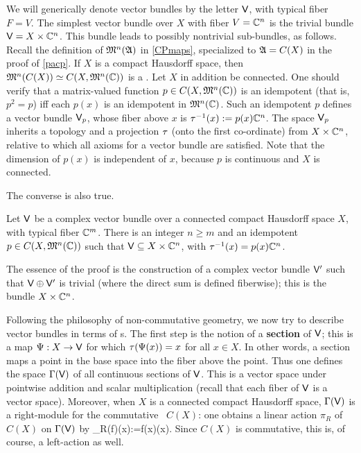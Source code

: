  We will generically denote vector bundles by the letter ${\sf V}$, with
typical fiber $F=V$.  The simplest vector bundle over $X$ with fiber
$V={\Bbb C}^n$ is the trivial bundle ${\sf V}=X\times {\Bbb C}^n$.  This bundle leads to
possibly nontrivial sub-bundles, as follows.  Recall the definition of
${\frak M}^n({\frak A})$ in \ref{CPmaps}, specialized to ${\frak A}=C(X)$ in the proof of
\ref{pacp}. If $X$ is a compact Hausdorff space, then
${\frak M}^n(C(X))\simeq C(X,{\frak M}^n({\Bbb C}))$ is a \ca. Let $X$ in addition be
connected. One should verify that a matrix-valued function $p\in
C(X,{\frak M}^n({\Bbb C}))$ is an idempotent (that is, $p^2=p$) iff each $p(x)$ is
an idempotent in ${\frak M}^n({\Bbb C})$. Such an idempotent $p$ defines a vector
bundle ${\sf V}_p$, whose fiber above $x$ is $\tau^{-1}(x):=p(x){\Bbb C}^n$. The
space ${\sf V}_p$ inherits a topology and a projection $\tau$ (onto the
first co-ordinate) from $X\times {\Bbb C}^n$, relative to which all axioms for a
vector bundle are satisfied. Note that the dimension of $p(x)$ is
independent of $x$, because $p$ is continuous and $X$ is connected.

The converse is also true.
\begin{Proposition}
Let ${\sf V}$ be a complex vector bundle over a connected compact
Hausdorff space $X$, with typical fiber ${\Bbb C}^m$.  There is an integer
$n\geq m$ and an idempotent $p\in C(X,{\frak M}^n({\Bbb C}))$ such that
${\sf V}\subseteq X\times{\Bbb C}^n$, with $\tau^{-1}(x)=p(x){\Bbb C}^n$.
\end{Proposition}

The essence of the proof is the construction of a complex vector
bundle ${\sf V}'$ such that ${\sf V}\oplus{\sf V}'$ is trivial (where the direct
sum is defined fiberwise); this is the bundle $X\times{\Bbb C}^n$.

Following the philosophy of non-commutative geometry, we now try to
describe vector bundles in terms of \ca s. The first step is the
notion of a {\bf section} of ${\sf V}$; this is a map $\Psi:X\rightarrow {\sf V}$ for
which $\tau(\Psi(x))=x$ for all $x\in X$. In other words, a section maps
a point in the base space into the fiber above the point. Thus one
defines the space $\Gamma({\sf V})$ of all continuous sections of ${\sf V}$. This
is a vector space under pointwise addition and scalar multiplication
(recall that each fiber of ${\sf V}$ is a vector space). Moreover, when
$X$ is a connected compact Hausdorff space, $\Gamma({\sf V})$ is a
right-module for the commutative \ca\ $C(X)$: one obtains a linear
action $\pi_R$ of $C(X)$ on $\Gamma({\sf V})$ by 
\be
\pi_R(f)\Ps(x):=f(x)\Ps(x). 
 \ee Since $C(X)$ is commutative, this is,
of course, a left-action as well.

